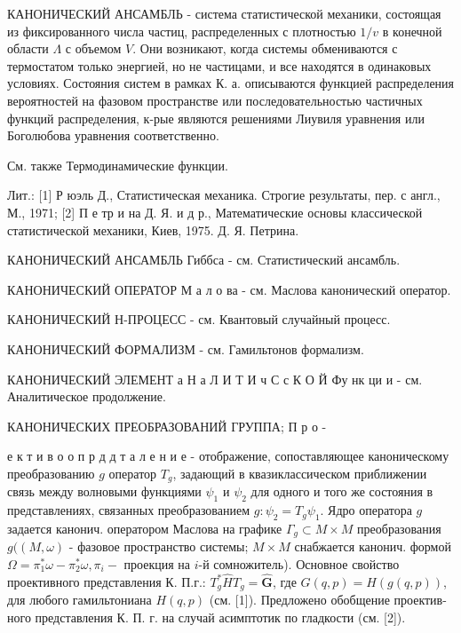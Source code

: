 \documentclass[10pt]{article}
\begin{document}
КАНОНИЧЕСКИЙ АНСАМБЛЬ - система статистической механики, состоящая из фиксированного числа частиц, распределенных с плотностью $1 / v$ в конечной области $\Lambda$ с объемом $V$. Они возникают, когда системы обмениваются с термостатом только энергией, но не частицами, и все находятся в одинаковых условиях. Состояния систем в рамках К. а. описываются функцией распределения вероятностей на фазовом пространстве или последовательностью частичных функций распределения, к-рые являются решениями Лиувиля уравнения или Боголюбова уравнения соответственно.



См. также Термодинамические функции.



Лит.: [1] Р юэль Д., Статистическая механика. Строгие результаты, пер. с англ., М., 1971; [2] П е тр и на Д. Я. и д р., Математические основы классической статистической механики, Киев, 1975. Д. Я. Петрина.



КАНОНИЧЕСКИЙ АНСАМБЛЬ Гиббса - см. Статистический ансамбль.



КАНОНИЧЕСКИЙ ОПЕРАТОР М а л о ва - см. Маслова канонический оператор.



КАНОНИЧЕСКИЙ Н-ПРОЦЕСС - см. Квантовый случайный процесс.



КАНОНИЧЕСКИЙ ФОРМАЛИЗМ - см. Гамильтонов формализм.



КАНОНИЧЕСКИЙ ЭЛЕМЕНТ а Н а Л И Т И ч С с К О Й Фу нк ци и - см. Аналитическое продолжение.



КАНОНИЧЕСКИХ ПРЕОБРАЗОВАНИЙ ГРУППА; П р о -



е к т и в о о п р д д т а л е н и е - отображение, сопоставляющее каноническому преобразованию $g$ оператор $T_{g}$, задающий в квазиклассическом приближении связь между волновыми функциями $\psi_{1}$ и $\psi_{2}$ для одного и того же состояния в представлениях, связанных преобразованием $g: \psi_{2}=T_{g} \psi_{1}$. Ядро оператора $g$ задается канонич. оператором Маслова на графике $\Gamma_{g} \subset M \times M$ преобразования $g((M, \omega)$ - фазовое пространство системы; $M \times M$ снабжается канонич. формой $\Omega=\pi_{1}^{*} \omega-\pi_{2}^{*} \omega, \pi_{i}-$ проекция на $i$-й сомножитель). Основное свойство проективного представления К. П.г.: $T_{g}^{*} \hat{H} T_{g}=\hat{\boldsymbol{G}}$, где $G(q, p)=H(g(q, p))$, для любого гамильтониана $H(q, p)$ (см. [1]). Предложено обобщение проектив- ного представления К. П. г. на случай асимптотик по гладкости (см. [2]).
\end{document}
